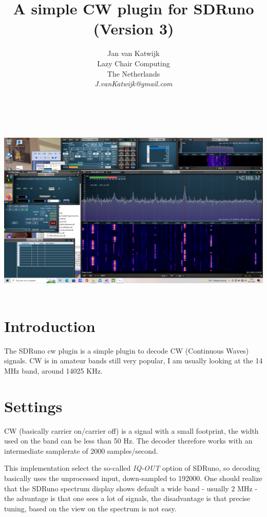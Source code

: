\documentclass[11pt]{article}
\begin{document}
\title{A simple CW plugin for SDRuno (Version 3)}
\author{
Jan van Katwijk\\
Lazy Chair Computing \\
The Netherlands\\
{\em J.vanKatwijk@gmail.com}}
\maketitle
\ \\
\ \\
\includegraphics[width=140mm]{cw-example.png}
\ \\
\section{Introduction}
The SDRuno cw plugin is a simple plugin to decode CW (Continuous Waves) signals.
CW is in amateur bands still very popular, I am usually looking at the
14 MHz band, around 14025 KHz. 

\section{Settings}
CW (basically carrier on/carrier off) is a signal with a small footprint,
the width used on  the band can be less than 50 Hz.
The decoder therefore works with an intermediate
samplerate of 2000 samples/second.
\par
This implementation select the so-called {\em IQ-OUT} option of SDRuno, so
decoding basically uses the unprocessed input, down-sampled to 192000.
One should realize that the SDRuno spectrum display shows default a
wide band - usually 2 MHz - the advantage is that one sees a lot of signals,
the disadvantage is that precise tuning, based on the view on
the spectrum is not easy.
\end{document}
